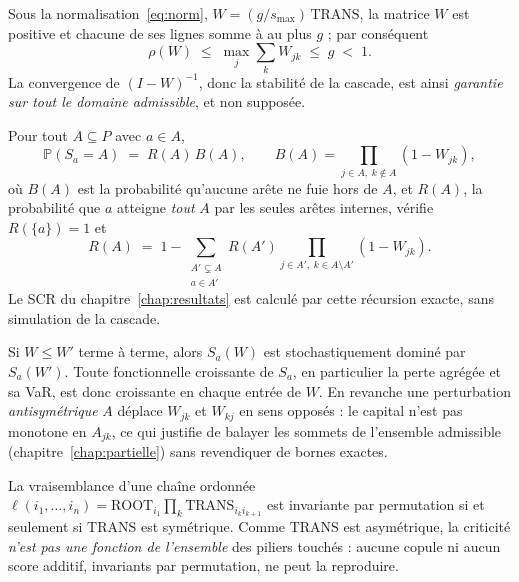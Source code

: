 \begin{proposition}
\label{prop:leontief}
Sous la normalisation~\eqref{eq:norm}, $W=(g/s_{\max})\,\mathrm{TRANS}$, la matrice $W$ est
positive et chacune de ses lignes somme à au plus $g$ ; par conséquent
\[
  \rho(W)\;\le\;\max_j\sum_k W_{jk}\;\le\;g\;<\;1 .
\]
La convergence de $(I-W)^{-1}$, donc la stabilité de la cascade, est ainsi \emph{garantie sur
tout le domaine admissible}, et non supposée.
\end{proposition}

\begin{proposition}
\label{prop:loi}
Pour tout $A\subseteq P$ avec $a\in A$,
\[
  \mathbb P(S_a=A)\;=\;R(A)\,B(A),\qquad
  B(A)=\!\!\prod_{j\in A,\;k\notin A}\!\!(1-W_{jk}),
\]
où $B(A)$ est la probabilité qu'aucune arête ne fuie hors de $A$, et $R(A)$, la probabilité
que $a$ atteigne \emph{tout} $A$ par les seules arêtes internes, vérifie $R(\{a\})=1$ et
\[
  R(A)\;=\;1-\sum_{\substack{A'\subsetneq A\\ a\in A'}} R(A')\!\!\prod_{j\in A',\;k\in A\setminus A'}\!\!(1-W_{jk}).
\]
Le SCR du chapitre~\ref{chap:resultats} est calculé par cette récursion exacte, sans
simulation de la cascade.
\end{proposition}

\begin{proposition}
\label{prop:mono}
Si $W\le W'$ terme à terme, alors $S_a(W)$ est stochastiquement dominé par $S_a(W')$. Toute
fonctionnelle croissante de $S_a$, en particulier la perte agrégée et sa VaR, est donc
croissante en chaque entrée de $W$. En revanche une perturbation \emph{antisymétrique}
$A$ déplace $W_{jk}$ et $W_{kj}$ en sens opposés : le capital n'est pas monotone en $A_{jk}$,
ce qui justifie de balayer les sommets de l'ensemble admissible
(chapitre~\ref{chap:partielle}) sans revendiquer de bornes exactes.
\end{proposition}

\begin{proposition}
\label{prop:ordre}
La vraisemblance d'une chaîne ordonnée $\ell(i_1,\dots,i_n)=\mathrm{ROOT}_{i_1}\prod_k
\mathrm{TRANS}_{i_k i_{k+1}}$ est invariante par permutation si et seulement si
$\mathrm{TRANS}$ est symétrique. Comme $\mathrm{TRANS}$ est asymétrique, la criticité
\emph{n'est pas une fonction de l'ensemble} des piliers touchés : aucune copule ni aucun
score additif, invariants par permutation, ne peut la reproduire.
\end{proposition}

